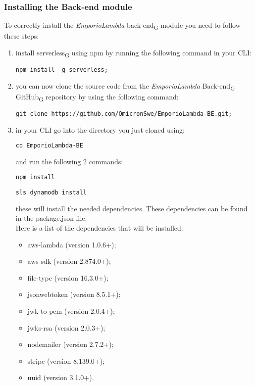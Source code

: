 \subsubsection{Installing the Back-end module}
To correctly install the \textit{EmporioLambda} back-end\textsubscript{G} module you need to follow these steps:
\begin{enumerate}
\item install serverless\textsubscript{G} using npm by running the following command in your CLI:\begin{center}
\texttt{npm install -g serverless;}
\end{center}
\item you can now clone the source code from the \textit{EmporioLambda} Back-end\textsubscript{G} GitHub\textsubscript{G} repository by using the following command:
\begin{center}
\texttt{git clone https://github.com/OmicronSwe/EmporioLambda-BE.git;}
\end{center}
\item in your CLI go into the directory you just cloned using:\begin{center}\texttt{cd EmporioLambda-BE}\end{center} and run the following 2 commands:
\begin{center}
\texttt{npm install}
\end{center}
\begin{center}
\texttt{sls dynamodb install}
\end{center}
these will install the needed dependencies. These dependencies can be found in the package.json file.\\Here is a list of the dependencies that will be installed:
\begin{itemize}
\item aws-lambda (version 1.0.6+);
\item aws-sdk (version 2.874.0+);
\item file-type (version 16.3.0+);
\item jsonwebtoken (version 8.5.1+);
\item jwk-to-pem (version 2.0.4+);
\item jwks-rsa (version 2.0.3+);
\item nodemailer (version 2.7.2+);
\item stripe (version 8.139.0+);
\item uuid (version 3.1.0+).


\end{itemize}
\end{enumerate}
